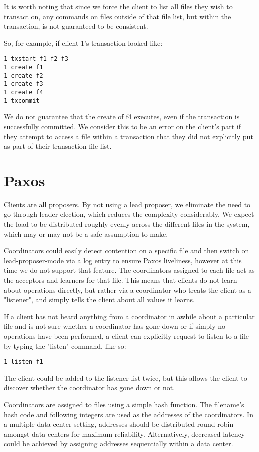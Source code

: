 \documentclass[11pt]{article}
\begin{document}
It is worth noting that since we force the client to list all files they wish to transact on, any commands on files outside of that file list, but within the transaction, is not guaranteed to be consistent.

So, for example, if client 1's transaction looked like:
\begin{verbatim}
1 txstart f1 f2 f3
1 create f1
1 create f2
1 create f3
1 create f4
1 txcommit
\end{verbatim}
We do not guarantee that the create of f4 executes, even if the transaction is successfully committed. We consider this to be an error on the client's part if they attempt to access a file within a transaction that they did not explicitly put as part of their transaction file list. 

\section{Paxos}

Clients are all proposers. By not using a lead proposer, we eliminate the need to go through leader election, which reduces the complexity considerably. We expect the load to be distributed roughly evenly across the different files in the system, which may or may not be a safe assumption to make.

Coordinators could easily detect contention on a specific file and then switch on lead-proposer-mode via a log entry to ensure Paxos liveliness, however at this time we do not support that feature.
The coordinators assigned to each file act as the acceptors and learners for that file. This means that clients do not learn about operations directly, but rather via a coordinator who treats the client as a "listener", and simply tells the client about all values it learns.

If a client has not heard anything from a coordinator in awhile about a particular file and is not sure whether a coordinator has gone down or if simply no operations have been performed, a client can explicitly request to listen to a file by typing the "listen" command, like so:

\begin{verbatim}
1 listen f1
\end{verbatim}

The client could be added to the listener list twice, but this allows the client to discover whether the coordinator has gone down or not.

Coordinators are assigned to files using a simple hash function.
The filename's hash code and following integers are used as the addresses of the coordinators.
In a multiple data center setting, addresses should be distributed round-robin amongst data centers for maximum reliability.
Alternatively, decreased latency could be achieved by assigning addresses sequentially within a data center.
\end{document}
